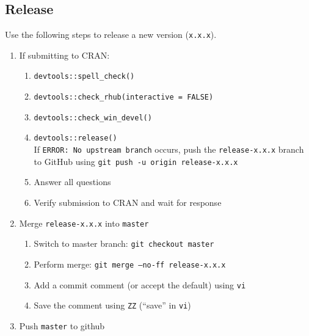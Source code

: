 \documentclass{article}
\begin{document}
\subsection{Release} 
\label{sec:release}

Use the following steps to release a new version (\texttt{x.x.x}).

\begin{enumerate}

  \item If submitting to CRAN:
  
	\begin{enumerate}
	  
	  \item \verb+devtools::spell_check()+

	  \item \verb+devtools::check_rhub(interactive = FALSE)+

	  \item \verb+devtools::check_win_devel()+

	  \item \verb+devtools::release()+ \\
            If \texttt{ERROR: No upstream branch} occurs, 
            push the \texttt{release-x.x.x} branch to GitHub using
            \texttt{git push -u origin release-x.x.x}
        
      \item Answer all questions
      
      \item Verify submission to CRAN and wait for response
            
	\end{enumerate}
  \item Merge \texttt{release-x.x.x} into \texttt{master}
  \begin{enumerate}

    \item Switch to master branch: \texttt{git checkout master} 

    \item Perform merge: \texttt{git merge --no-ff release-x.x.x}
	
	\item Add a commit comment (or accept the default) using \texttt{vi} 
	
	\item Save the comment using \texttt{ZZ} (``save'' in \texttt{vi})
	
  \end{enumerate}
  \item Push \texttt{master} to github
  

\end{enumerate}
\end{document}

